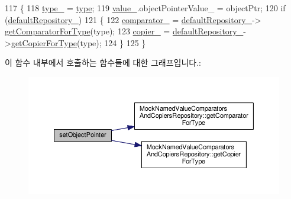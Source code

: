 \begin{DoxyCode}
117 \{
118     \hyperlink{class_mock_named_value_ad41f1c1c681fbfc6ba0ef62ac34ac075}{type\_} = \hyperlink{namespaceastime__fitline_a7aead736a07eaf25623ad7bfa1f0ee2d}{type};
119     \hyperlink{class_mock_named_value_a68986aee29946116b59c6189c19733ac}{value\_}.objectPointerValue\_ = objectPtr;
120     \textcolor{keywordflow}{if} (\hyperlink{class_mock_named_value_a9a4f3e52c21f9f16c6d72144e62601c4}{defaultRepository\_})
121     \{
122         \hyperlink{class_mock_named_value_ab6a2a3a4434b05754363c3c0137ffeb1}{comparator\_} = \hyperlink{class_mock_named_value_a9a4f3e52c21f9f16c6d72144e62601c4}{defaultRepository\_}->
      \hyperlink{class_mock_named_value_comparators_and_copiers_repository_a8664d35dd3af8052c86639c2b56e1030}{getComparatorForType}(type);
123         \hyperlink{class_mock_named_value_a054cf03c0e14abbd5f9f4c9604b5bfbe}{copier\_} = \hyperlink{class_mock_named_value_a9a4f3e52c21f9f16c6d72144e62601c4}{defaultRepository\_}->\hyperlink{class_mock_named_value_comparators_and_copiers_repository_a39b6e1f8952e28ad6d4779e40b4f0b0d}{getCopierForType}(type);
124     \}
125 \}
\end{DoxyCode}


이 함수 내부에서 호출하는 함수들에 대한 그래프입니다.\+:
\nopagebreak
\begin{figure}[H]
\begin{center}
\leavevmode
\includegraphics[width=350pt]{class_mock_named_value_afb0af4eeafa2323ab0de8212c46a50d7_cgraph}
\end{center}
\end{figure}




